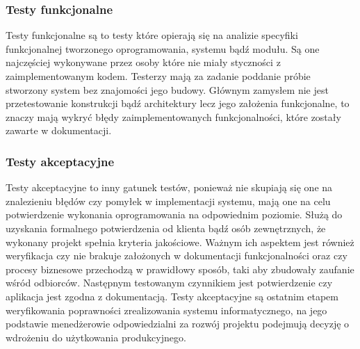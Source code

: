 \documentclass[oneside,polski,logo]{amuthesis}
\begin{document}
\subsubsection {Testy funkcjonalne}
Testy funkcjonalne są to testy które opierają się na analizie specyfiki funkcjonalnej tworzonego oprogramowania, systemu bądź modułu. Są one najczęściej wykonywane przez osoby które nie miały styczności z zaimplementowanym kodem. Testerzy mają za zadanie poddanie próbie stworzony system bez znajomości jego budowy. Głównym zamysłem nie jest przetestowanie konstrukcji bądź architektury lecz jego założenia funkcjonalne, to znaczy mają wykryć błędy zaimplementowanych funkcjonalności, które zostały zawarte w dokumentacji.\cite{testF}\\

\subsubsection {Testy akceptacyjne}
Testy akceptacyjne to inny gatunek testów, ponieważ nie skupiają się one na znalezieniu błędów czy pomyłek w implementacji systemu, mają one na celu potwierdzenie wykonania oprogramowania na odpowiednim poziomie. Służą do uzyskania formalnego potwierdzenia od klienta bądź osób zewnętrznych, że wykonany projekt spełnia kryteria jakościowe. Ważnym ich aspektem jest również weryfikacja czy nie brakuje założonych w dokumentacji funkcjonalności oraz czy procesy biznesowe przechodzą w prawidłowy sposób, taki aby zbudowały zaufanie wśród odbiorców. Następnym testowanym czynnikiem jest potwierdzenie czy aplikacja jest zgodna z dokumentacją. Testy akceptacyjne są ostatnim etapem weryfikowania poprawności zrealizowania systemu informatycznego, na jego podstawie menedżerowie odpowiedzialni za rozwój projektu podejmują decyzję o wdrożeniu do użytkowania produkcyjnego.\cite{testA} \\ \\ \\ \\ \\ \\ \\ \\
\end{document}
